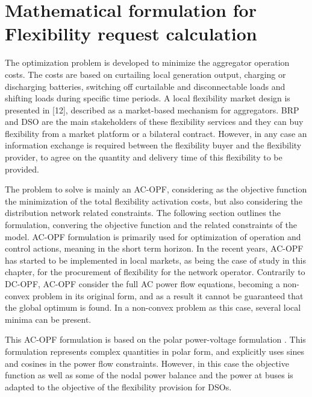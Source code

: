 \section{Mathematical formulation for Flexibility request calculation}
The optimization problem is developed to minimize the aggregator operation costs. The costs are based on curtailing local generation output, charging or discharging batteries, switching off curtailable and disconnectable loads and shifting loads during specific time periods. A local flexibility market design is presented in [12], described as a market-based mechanism for aggregators. BRP and DSO are the main stakeholders of these flexibility services and they can buy flexibility from a market platform or a bilateral contract. However, in any case an information exchange is required between the flexibility buyer and the flexibility provider, to agree on the quantity and delivery time of this flexibility to be provided. 

The problem to solve is mainly an AC-OPF, considering as the objective function the minimization of the total flexibility activation costs, but also considering the distribution network related constraints. The following section outlines the formulation, convering the objective function and the related constraints of the model. AC-OPF formulation is primarily used for optimization of operation and control actions, meaning in the short term horizon. In the recent years, AC-OPF has started to be implemented in local markets, as being the case of study in this chapter, for the procurement of flexibility for the network operator. Contrarily to DC-OPF, AC-OPF consider the full AC power flow equations, becoming a non-convex problem in its original form, and as a result it cannot be guaranteed that the global optimum is found. In a non-convex problem as this case, several local minima can be present. 

This AC-OPF formulation is based  on the polar power-voltage formulation \cite{OPF_Formulation}. This formulation represents complex quantities in polar form, and explicitly uses sines and cosines in the power flow constraints. However, in this case the objective function as well as some of the nodal power balance and the power at buses is adapted to the objective of the flexibility provision for DSOs.

